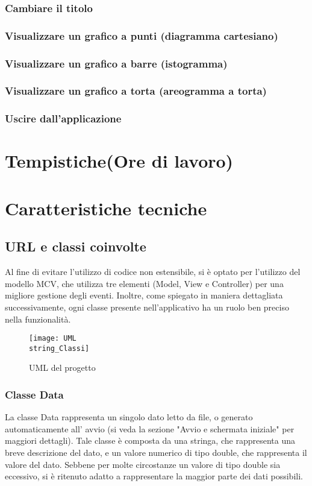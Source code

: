 \documentclass[10pt]{article}
\begin{document}
    \subsubsection{Cambiare il titolo}
    \subsubsection{Visualizzare un grafico a punti (diagramma cartesiano)}
    \subsubsection{Visualizzare un grafico a barre (istogramma)}
    \subsubsection{Visualizzare un grafico a torta (areogramma a torta)}
    \subsubsection{Uscire dall'applicazione}
    \section{Tempistiche(Ore di lavoro)}
    \section{Caratteristiche tecniche}
    \subsection{URL e classi coinvolte}
    
    Al fine di evitare l'utilizzo di codice non estensibile, si è optato per l'utilizzo del modello MCV, che utilizza tre elementi (Model, View e Controller) per una migliore gestione degli eventi. Inoltre, come spiegato in maniera dettagliata successivamente, ogni classe presente nell'applicativo ha un ruolo ben preciso nella funzionalità.
    
    \begin{figure}[h!]
    	\centering
    	\texttt{[image: UML\\string\_Classi]}
    	\caption{UML del progetto}
    	\label{fig:umlclassi}
    \end{figure}

    \subsubsection{Classe Data}
    La classe Data rappresenta un singolo dato letto da file, o generato automaticamente all' avvio (si veda la sezione "Avvio e schermata iniziale" per maggiori dettagli).
    Tale classe è composta da una stringa, che rappresenta una breve descrizione del dato, e un valore numerico di tipo double, che rappresenta il valore del dato. Sebbene per molte circostanze un valore di tipo double sia eccessivo, si è ritenuto adatto a rappresentare la maggior parte dei dati possibili.
\end{document}
